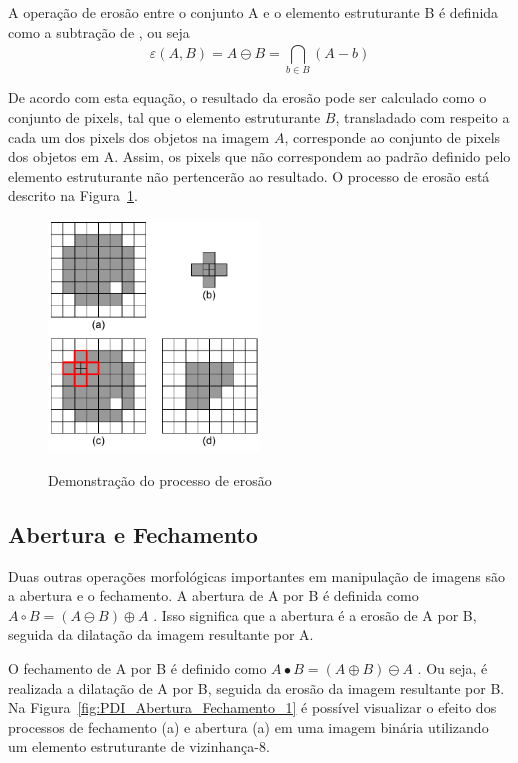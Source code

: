 \documentclass[12pt,oneside,a4paper,english,french,spanish,brazil,]{abntex2}
\begin{document}
A operação de erosão entre o conjunto A e o elemento estruturante B é definida como a subtração de \citet{minkowski:1911}, ou seja \[\varepsilon(A,B)=A\ominus B=\bigcap_{b\in B}^{ } (A-b)\]

De acordo com esta equação, o resultado da erosão pode ser calculado como o conjunto de pixels, tal que o elemento estruturante \(B\), transladado com respeito a cada um dos pixels dos objetos na imagem \(A\), corresponde ao conjunto de pixels dos objetos em A. Assim, os pixels que não correspondem ao padrão definido pelo elemento estruturante não pertencerão ao resultado. O processo de erosão está descrito na Figura~\ref{fig:PDI_Erosao_1}.

\begin{figure}[ht]
\centering
\caption{Demonstração do processo de erosão}
\includegraphics[width=0.5\textwidth]{imagens/PDI_Erosao_1.pdf}
\sourceAuthor
\label{fig:PDI_Erosao_1}
\end{figure}

\subsection{Abertura e Fechamento}

Duas outras operações morfológicas importantes em manipulação de imagens são a abertura e o fechamento. A abertura de A por B é definida como \(A \circ  B = (A \ominus B) \oplus A\) \cite{pedrini:2008}. Isso significa que a abertura é a erosão de A por B, seguida da dilatação da imagem resultante por A.

O fechamento de A por B é definido como \(A \bullet  B = (A \oplus B) \ominus A\) \cite{pedrini:2008}. Ou seja, é realizada a dilatação de A por B, seguida da erosão da imagem resultante por B.
Na Figura~\ref{fig:PDI_Abertura_Fechamento_1} é possível visualizar o efeito dos processos de fechamento (a) e abertura (a) em uma imagem binária utilizando um elemento estruturante de vizinhança-8.
\end{document}
